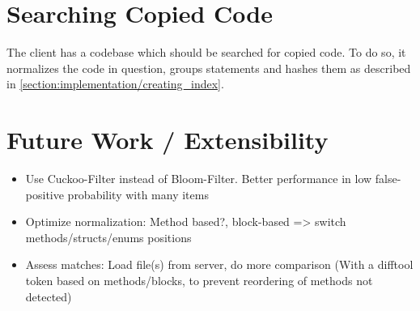 \section{Searching Copied Code}\label{section:implementation/searching_copied_code}
The client has a codebase which should be searched for copied code.
To do so, it normalizes the code in question, groups statements and hashes them as described in \autoref{section:implementation/creating_index}.

\section{Future Work / Extensibility}\label{section:implementation/extensibility}
\begin{itemize}
	\item Use Cuckoo-Filter \cite{fan2014cuckoo} instead of Bloom-Filter. Better performance in low false-positive probability with many items
	\item Optimize normalization: Method based?, block-based => switch methods/structs/enums positions
	\item Assess matches: Load file(s) from server, do more comparison (With a difftool token based on methods/blocks, to prevent reordering of methods not detected)
\end{itemize}